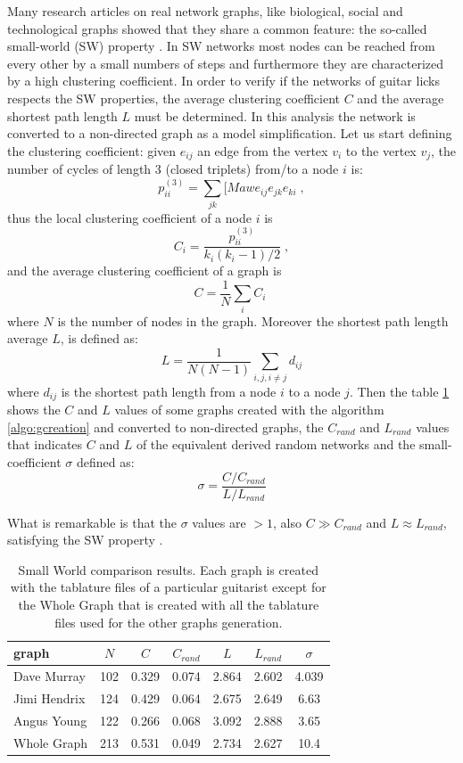 \documentclass{llncs}
\begin{document}
Many research articles on real network graphs, like biological, 
social and technological graphs showed that they share a common
feature: the so-called small-world (SW) property \cite{sw-watts}.
In SW networks most nodes can be reached from every other by a small
numbers of steps and furthermore they are characterized by a high
clustering coefficient. In order to verify if the networks of guitar
licks respects the SW properties, the average clustering coefficient $C$ and the
average shortest path length $L$ must be determined\cite{sw-ubiquity}. In this analysis
the network is converted to a non-directed graph as a model
simplification. Let us start defining 
the clustering coefficient: given $e_{ij}$ an edge from the vertex $v_i$
to the vertex $v_j$, the number of cycles of length 3 (closed triplets) from/to a node $i$ is:
\[ p_{ii}^{(3)} = \sum_{jk}[Maw{e_{ij}e_{jk}e_{ki}}\;, \]
thus the local clustering coefficient of a node $i$ is 
\[ C_i = \frac{p_{ii}^{(3)}}{k_i(k_i-1)/2} \; ,\]
and the average clustering coefficient of a graph is
\[ C = \frac{1}{N} \sum_{i}{C_i} \;  \]
where $N$ is the number of nodes in the graph.
Moreover the shortest path length average $L$, is defined as:
\[ L = \frac{1}{N(N - 1)} \sum_{i,j,i \neq j}{d_{ij}} \]
where $d_{ij}$ is the shortest path length from a node $i$ to a node
$j$.
Then the table \ref{tab:sw} shows the $C$ and $L$ values of some graphs created with the algorithm
\ref{algo:gcreation} and converted to non-directed graphs, the $C_{rand}$
and $L_{rand}$ values that indicates $C$ and $L$ of the equivalent
derived random networks and the small-coefficient $\sigma$ defined as:
\[ \sigma = \frac{C / C_{rand}}{L / L_{rand}} \]

What is remarkable is that the $\sigma$ values are $> 1$, also $C \gg
C_{rand}$ and $L \approx L_{rand}$, satisfying the SW property
\cite{sw-ubiquity}.
\setlength{\tabcolsep}{8pt}
\begin{table}
\begin{center}
  \begin{tabular}{ l c c c c c c  }
    \hline
    graph  & $N$ & $C$ & $C_{rand}$ & $L$ & $L_{rand}$ & $\sigma$ \\ \hline
    Dave Murray & 102 & 0.329 & 0.074 & 2.864 & 2.602 & 4.039 \\
	Jimi Hendrix & 124 & 0.429 & 0.064 & 2.675 & 2.649 & 6.63 \\
	Angus Young & 122 & 0.266 & 0.068 & 3.092 & 2.888 & 3.65 \\ 
	Whole Graph & 213 & 0.531 & 0.049 & 2.734 & 2.627 & 10.4 \\
    \hline
  \end{tabular}
\end{center}
  \caption{Small World comparison results. Each graph is created with
the tablature files of a particular guitarist except for the Whole Graph
that is created with all the tablature files used for the other graphs
generation.}
  \label{tab:sw}
\end{table}
 
\end{document}
